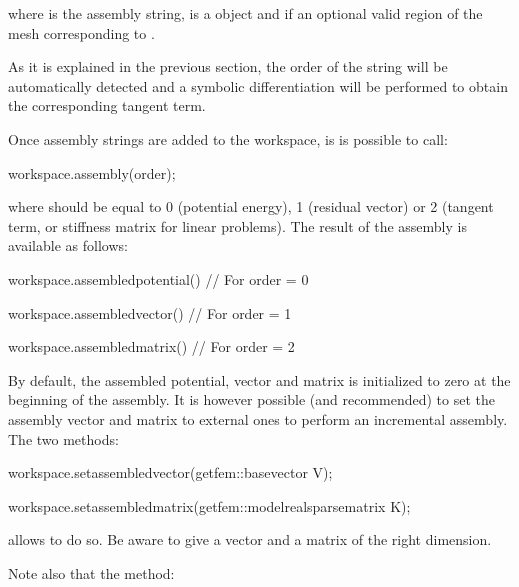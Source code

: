 \documentclass[a4paper,11pt,english]{sphinxmanual}
\begin{document}
where  is the assembly string,  is a  object and  if an optional valid region of the mesh corresponding to .

As it is explained in the previous section, the order of the string will be automatically detected and a symbolic differentiation will be performed to obtain the corresponding tangent term.

Once assembly strings are added to the workspace, is is possible to call:

\begin{sphinxVerbatim}[commandchars=\\\{\}]
workspace.assembly(order);
\end{sphinxVerbatim}

where  should be equal to 0 (potential energy), 1 (residual vector) or 2 (tangent term, or stiffness matrix for linear problems). The result of the assembly is available as follows:

\begin{sphinxVerbatim}[commandchars=\\\{\}]
workspace.assembled\PYGZus{}potential() // For order = 0

workspace.assembled\PYGZus{}vector()    // For order = 1

workspace.assembled\PYGZus{}matrix()    // For order = 2
\end{sphinxVerbatim}

By default, the assembled potential, vector and matrix is initialized to zero at the beginning of the assembly. It is however possible (and recommended) to set the assembly vector and matrix to external ones to perform an incremental assembly. The two methods:

\begin{sphinxVerbatim}[commandchars=\\\{\}]
workspace.set\PYGZus{}assembled\PYGZus{}vector(getfem::base\PYGZus{}vector \PYGZam{}V);

workspace.set\PYGZus{}assembled\PYGZus{}matrix(getfem::model\PYGZus{}real\PYGZus{}sparse\PYGZus{}matrix \PYGZam{}K);
\end{sphinxVerbatim}

allows to do so. Be aware to give a vector and a matrix of the right dimension.

Note also that the method:
\end{document}
